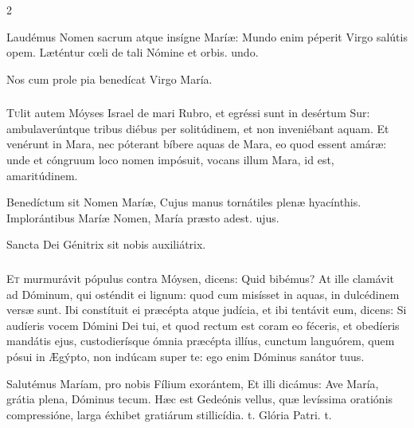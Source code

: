 \documentclass[9pt,twoside]{extarticle}
\begin{document}
\begin{multicols}{2}
\begin{tightlist}{}
\item {} Laudémus Nomen sacrum atque insígne Maríæ: \textred{*} Mundo enim péperit Virgo salútis opem.  Læténtur cœli de tali Nómine et orbis. undo.
\item {\small {} Nos cum prole pia benedícat Virgo María.}
\end{tightlist}

\subsubsection*{\center {}}
\lettrine{T}ulit autem Móyses Israel de mari Rubro, et egréssi sunt in desértum Sur: ambulaverúntque tribus diébus per solitúdinem, et non inveniébant aquam. Et venérunt in Mara, nec póterant bíbere aquas de Mara, eo quod essent amáræ: unde et cóngruum loco nomen impósuit, vocans illum Mara, id est, amaritúdinem.

\begin{tightlist}{}
\item {} Benedíctum sit Nomen Maríæ, \textred{*} Cujus manus tornátiles plenæ hyacínthis.  Implorántibus Maríæ Nomen, María præsto adest. ujus.
\item {\small {} Sancta Dei Génitrix sit nobis auxiliátrix.}
\end{tightlist}

\subsubsection*{\center {}}
\lettrine{E}t murmurávit pópulus contra Móysen, dicens: Quid bibémus? At ille clamávit ad Dóminum, qui osténdit ei lignum: quod cum misísset in aquas, in dulcédinem versæ sunt. Ibi constítuit ei præcépta atque judícia, et ibi tentávit eum, dicens: Si audíeris vocem Dómini Dei tui, et quod rectum est coram eo féceris, et obedíeris mandátis ejus, custodierísque ómnia præcépta illíus, cunctum languórem, quem pósui in Ægýpto, non indúcam super te: ego enim Dóminus sanátor tuus.

\begin{tightlist}{}
\item {} Salutémus Maríam, pro nobis Fílium exorántem, \textred{*} Et illi dicámus: Ave María, grátia plena, Dóminus tecum.  Hæc est Gedeónis vellus, quæ levíssima oratiónis compressióne, larga éxhibet gratiárum stillicídia. t. Glória Patri. t.
\end{tightlist}


\end{multicols}
\end{document}
